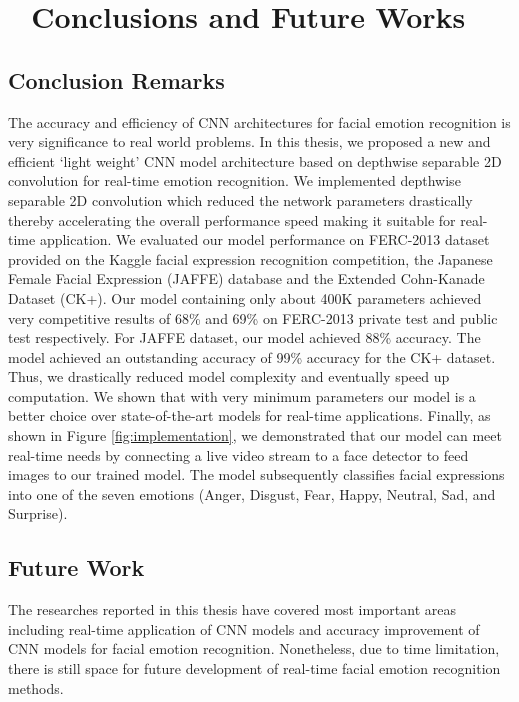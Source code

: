 \documentclass[master]{thesis-uestc}
\begin{document}


\chapter{\,\,\,\,\,\textbf{Conclusions and Future Works}}
\section*{Conclusion Remarks}
The accuracy and efficiency of CNN architectures for facial emotion recognition is very significance to real world problems. In this thesis, we proposed a new and efficient `light weight' CNN model architecture based on depthwise separable 2D convolution for real-time emotion recognition. We implemented depthwise separable 2D convolution which reduced the network parameters drastically thereby accelerating the overall performance speed making it suitable for real-time application. We evaluated our model performance on FERC-2013 dataset provided on the Kaggle facial expression recognition competition, the Japanese Female Facial Expression (JAFFE) database and the Extended Cohn-Kanade Dataset (CK+). Our model containing only about 400K parameters achieved very competitive results of 68\% and 69\% on FERC-2013 private test and public test respectively. For JAFFE dataset, our model achieved 88\% accuracy. The model achieved an outstanding accuracy of 99\% accuracy for the CK+ dataset. Thus, we drastically reduced model complexity and eventually speed up computation. We shown that with very minimum parameters our model is a better choice over state-of-the-art models for real-time applications. Finally, as shown in Figure \ref{fig:implementation}, we demonstrated that our model can meet real-time needs by connecting a live video stream to a face detector to feed images to our trained model. The model subsequently classifies facial expressions into one of the seven emotions (Anger, Disgust, Fear, Happy, Neutral, Sad, and Surprise).

\section*{Future Work}
The researches reported in this thesis have covered most important areas including real-time application of CNN models and accuracy improvement of CNN models for facial emotion recognition. Nonetheless, due to time limitation, there is still space for future development of real-time facial emotion recognition methods. 
\end{document}
